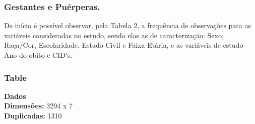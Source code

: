 \documentclass[
]{article}
\begin{document}
\hypertarget{gestantes-e-puuxe9rperas.}{%
\subsubsection{Gestantes e Puérperas.}\label{gestantes-e-puuxe9rperas.}}

De início é possível observar, pela Tabela 2, a frequência de
observações para as variáveis consideradas no estudo, sendo elas as de
caracterização: Sexo, Raça/Cor, Escolaridade, Estado Civil e Faixa
Etária, e as variáveis de estudo Ano do obito e CID`s.

\hypertarget{table}{%
\subsubsection{Table}\label{table}}

\textbf{Dados}\\
\textbf{Dimensões:} 3294 x 7\\
\textbf{Duplicadas:} 1310
\end{document}
